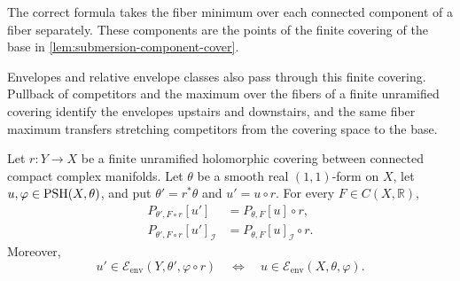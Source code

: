 The correct formula takes the fiber minimum over each connected component of a fiber separately. These components are the points of the finite covering of the base in \cref{lem:submersion-component-cover}.

Envelopes and relative envelope classes also pass through this finite covering. Pullback of competitors and the maximum over the fibers of a finite unramified covering identify the envelopes upstairs and downstairs, and the same fiber maximum transfers stretching competitors from the covering space to the base.

\begin{proposition}\label{prop:finite-cover-envelope-transport}
Let $r\colon Y\to X$ be a finite unramified holomorphic covering between connected compact complex manifolds. Let $\theta$ be a smooth real $(1,1)$-form on $X$, let $u,\varphi\in\mathrm{PSH}(X,\theta)$, and put $\theta'=r^*\theta$ and $u'=u\circ r$. For every $F\in C(X,\mathbb R)$,
\[
 \begin{split}
 P_{\theta',F\circ r}[u']&=P_{\theta,F}[u]\circ r,\\
 P_{\theta',F\circ r}[u']_{\mathcal I}
   &=P_{\theta,F}[u]_{\mathcal I}\circ r.
 \end{split}
\]
Moreover,
\[
 u'\in\mathcal E_{\mathrm{env}}(Y,\theta',\varphi\circ r)
 \quad\Longleftrightarrow\quad
 u\in\mathcal E_{\mathrm{env}}(X,\theta,\varphi).
\]
\end{proposition}
